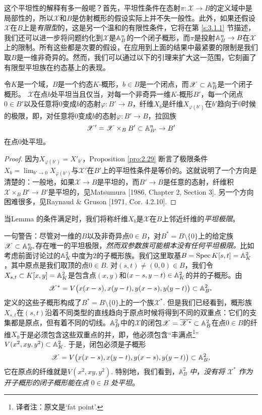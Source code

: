 这个平坦性的解释有多一般呢？首先，平坦性条件在态射$\pi:\mathscr{X}\to B$的定义域\nottran 中是局部性的，所以$\mathscr{X}$和$B$是仿射概形的假设实际上并不失一般性。此外，如果还假设$\mathscr{X}$在$B$上是\textit{有限型}的，这是另一个温和的有限性条件，它将在第 \ref{s:3.1.1} 节描述，我们还可以进一步将问题约化到$\mathscr{X}$是$\mathbb{A}_B^n$的一个闭子概形，而$\pi$是投射$\mathbb{A}_B^n\to B$在$\mathscr{X}$上的限制。所有这些都是次要的假设，在应用到上面的结果中最紧要的限制是我们取$B$是一维非奇异的。然而，我们可以通过以下的引理来扩大这一范围，它刻画了有限型平坦族在约态基上的表现。

\begin{lem}\label{lem:2.30}
	令$K$是一个域，$B$是一个约态$K$\hyp 概形，$b\in B$是一个闭点，而$\mathscr{X}\subset \mathbb{A}_{B}^n$是一个闭子概形。 $\mathscr{X}$在点$b$处平坦当且仅当，对每一个非奇异一维$K$\hyp 概形$B'$，每一个闭点$0\in B'$以及任意将$0$变成$b$的态射$\varphi:B'\to B$，纤维$X_b$是纤维$X_{\varphi(b')}$在$b'$趋向于$0$时候的极限，即，对任意将$0$变成$b$的态射$\varphi:B'\to B$，拉回族
	\[
	\mathscr{X}'=\mathscr{X}\times_B B'\subset \mathbb{A}_{B'}^n\to B'
	\]
	在点$0$处平坦。
\end{lem}

\begin{proof}
因为$X_{\varphi(b')}=X'_{b'}$，Proposition \ref{pro:2.29} 断言了极限条件$X_b=\lim_{b'\to 0}X_{\varphi(b')}$与$\mathscr{X}'$在$B'$上的平坦性条件是等价的。这就说明了一个方向是清楚的：一般地，如果$\mathscr{X}\to B$是平坦的，而$B'\to B$是任意的态射，纤维积$\mathscr{X}\times_B B'\to B'$是平坦的，见Matsumura [1986, Chapter 2, Section 3]. 另一个方向困难很多，见Raynaud \& Gruson [1971, Cor. 4.2.10].
\end{proof}

当Lemma \thethm 的条件满足时，我们将称纤维$X_b$是$\mathscr{X}$在$B$上邻近纤维的\textit{平坦极限}。

一句警告：尽管对一维的$B$以及非奇异点$0\in B$，对$B^*=B\setminus \{0\}$上的给定族$\mathscr{X}\subset \mathbb{A}_{B^*}^n$存在唯一的平坦极限，\textit{然而双参数族可能根本没有任何平坦极限。}比如考虑前面讨论过的$\mathbb{A}_K^2$中度为$2$的子概形族。我们这里取基$B=\operatorname{Spec} K[s,t]=\mathbb{A}_{K}^2$，其中原点是我们取顶的点$0\in B$. 对$(s,t)\neq (0,0)\in B$，我们令$X_{s,t}\subset K[x,y]=\mathbb{A}_K^2$是包含点$(x,y)$和$(x-s,y-t)\in \mathbb{A}_K^2$的并的子概形。由
\[
	\mathscr{X}^*=V\bigl(x(x-s),x(y-t),y(x-s),y(y-t)\bigr)\subset \mathbb{A}_{B^*}^2
\]
定义的这些子概形构成了$B^*=B\setminus \{0\}$上的一个族$\mathscr{X}^*$. 但是我们已经看到，概形族$X_{s,t}$在$(s,t)$沿着不同类型的直线趋向于原点时候将得到不同的双重点：它们的支集都是原点，但有着不同的切线。$\mathbb{A}_B^2$中的$\mathscr{X}$的闭包$\mathscr{X}=\overline{\mathscr{X}^*}\subset \mathbb{A}_B^2$在点$0\in B$的纤维$X_0$于是必须包含这些双重点的并，即，他必须包含“丰满点\footnote{译者注：原文是`fat point'.}”$V(x^2,xy,y^2)\subset \mathbb{A}_K^2$. 于是，闭包必须是子概形
\[
	\mathscr{X}=V\bigl(x(x-s),x(y-t),y(x-s),y(y-t)\bigr)\subset \mathbb{A}_{B}^2,
\]
它在原点的纤维就是$V(x^2,xy,y^2)$. 特别地，我们看到，$\mathbb{A}_B^2$ \textit{中}，\textit{没有将} $\mathscr{X}^*$ {\large\it 作为开子概形的闭子概形能在点} $0\in B$ \textit{处平坦}。


